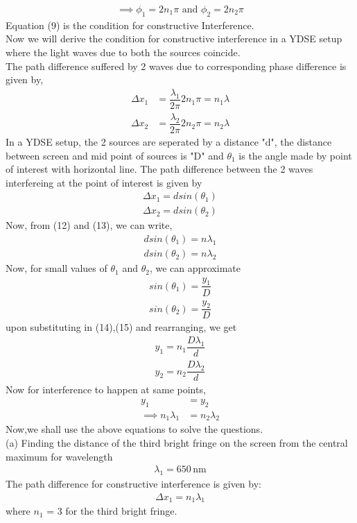 \documentclass[journal,12pt,twocolumn]{IEEEtran}
\theoremstyle{remark}
\begin{document}
\begin{align}
\implies \phi_1=2n_1\pi \text{ and } \phi_2=2n_2\pi
\end{align}
Equation (9) is the condition for constructive Interference.\\
Now we will derive the condition for constructive interference in a YDSE setup where the light waves due to both the sources coincide.\\
The path difference suffered by 2 waves due to corresponding phase difference is given by,
\begin{align}
    \Delta x_1&=\dfrac{\lambda_1}{2\pi}2n_1\pi=n_1\lambda\\
    \Delta x_2&=\dfrac{\lambda_2}{2\pi}2n_2\pi=n_2\lambda
\end{align}
In a YDSE setup, the 2 sources are seperated by a distance "d", the distance between screen and mid point of sources is "D" and $\theta_1$ is the angle made by point of interest with horizontal line. The path difference between the 2 waves interfereing at the point of interest is given by 
\begin{align}
    \Delta x_1 = dsin(\theta_1)\\
    \Delta x_2 = dsin(\theta_2)
\end{align}
Now, from (12) and (13), we can write,
\begin{align}
    dsin(\theta_1)=n\lambda_1\\
    dsin(\theta_2)=n\lambda_2
\end{align}
Now, for small values of $\theta_1$ and $\theta_2$, we can approximate 
\begin{align}
    sin(\theta_1)=\dfrac{y_1}{D}\\
    sin(\theta_2)=\dfrac{y_2}{D}
\end{align}
upon substituting in (14),(15) and rearranging, we get
\begin{align}
    y_1=n_1\dfrac{D\lambda_1}{d}\\
    y_2=n_2\dfrac{D\lambda_2}{d}
\end{align}
Now for interference to happen at same points,
\begin{align}
         y_1&=y_2\\
\implies n_1\lambda_1&=n_2\lambda_2
\end{align}
Now,we shall use the above equations to solve the questions.
\\
(a) Finding the distance of the third bright fringe on the screen from the central maximum for wavelength
\begin{align}
\lambda_1 = 650 \, \text{nm}
\end{align}
The path difference for constructive interference is given by:
\begin{align}
\Delta x_1 = n_1\lambda_1     
\end{align}
where  $n_1$ = 3  for the third bright fringe.
\end{document}
